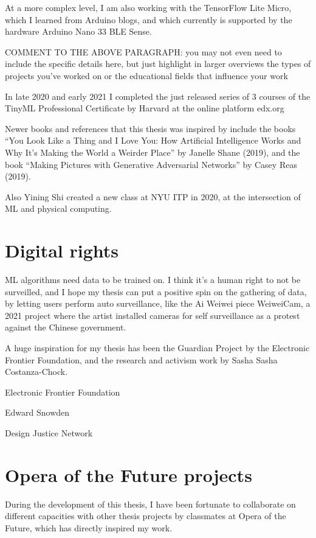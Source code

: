 At a more complex level, I am also working with the TensorFlow Lite Micro, which I learned from Arduino blogs, and which currently is supported by the hardware Arduino Nano 33 \acrshort{BLE} Sense.

COMMENT TO THE ABOVE PARAGRAPH: you may not even need to include the specific details here, but just highlight in larger overviews the types of projects you've worked on or the educational fields that influence your work

In late 2020 and early 2021 I completed the just released series of 3 courses of the TinyML Professional Certificate by Harvard at the online platform edx.org

Newer books and references that this thesis was inspired by include the books “You Look Like a Thing and I Love You: How Artificial Intelligence Works and Why It's Making the World a Weirder Place” by Janelle Shane (2019), and the book “Making Pictures with Generative Adversarial Networks” by Casey Reas (2019).

Also Yining Shi created a new class at \acrshort{NYU} \acrshort{ITP} in 2020, at the intersection of \acrshort{ML} and physical computing.

\section{Digital rights}

\acrshort{ML} algorithms need data to be trained on. I think it’s a human right to not be surveilled, and I hope my thesis can put a positive spin on the gathering of data, by letting users perform auto surveillance, like the Ai Weiwei piece WeiweiCam, a 2021 project where the artist installed cameras for self surveillance as a protest against the Chinese government.

A huge inspiration for my thesis has been the Guardian Project by the Electronic Frontier Foundation, and the research and activism work by Sasha Sasha Costanza-Chock.

Electronic Frontier Foundation

Edward Snowden

Design Justice Network

\section{Opera of the Future projects}

During the development of this thesis, I have been fortunate to collaborate on different capacities with other thesis projects by classmates at Opera of the Future, which has directly inspired my work.

